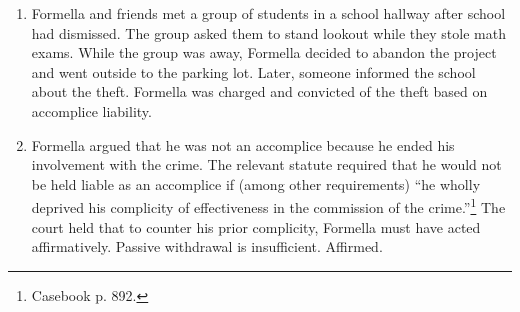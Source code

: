 \begin{enumerate}
    \item Formella and friends met a group of students in a school hallway 
    after school had dismissed. The group asked them to stand lookout while 
    they stole math exams. While the group was away, Formella decided to 
    abandon the project and went outside to the parking lot. Later, someone 
    informed the school about the theft. Formella was charged and convicted of 
    the theft based on accomplice liability.
    \item Formella argued that he was not an accomplice because he ended his 
    involvement with the crime. The relevant statute required that he would 
    not be held liable as an accomplice if (among other requirements) ``he 
    wholly deprived his complicity of effectiveness in the commission of the 
    crime.''\footnote{Casebook p. 892.} The court held that to counter his 
    prior complicity, Formella must have acted affirmatively. Passive 
    withdrawal is insufficient. Affirmed.
\end{enumerate}

